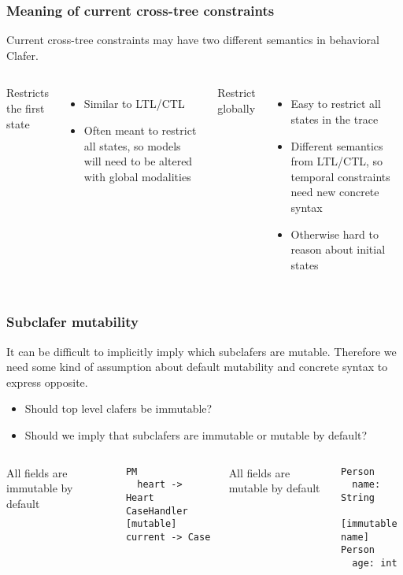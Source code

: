 \documentclass[xcolor=dvipsnames,12pt]{beamer}
\begin{document}
  \begin{frame}[fragile]
    \frametitle{Meaning of current cross-tree constraints}
    Current cross-tree constraints may have two different semantics in behavioral Clafer.

    \mbox{}

    \begin{columns}[t]
      \column{2in}
      Restricts the first state
      \begin{itemize}
        \item Similar to LTL/CTL
        \item Often meant to restrict all states, so models will need to be altered with global modalities
      \end{itemize}
    \column{2in}
    Restrict globally
    \begin{itemize}
      \item{Easy to restrict all states in the trace}
      \item{Different semantics from LTL/CTL, so temporal constraints need new concrete syntax}
      \item{Otherwise hard to reason about initial states}
      \end{itemize}
    \end{columns}    
\end{frame}

  \begin{frame}[fragile]
    \frametitle{Subclafer mutability}
    It can be difficult to implicitly imply which subclafers are mutable. Therefore we need some kind of assumption about default mutability and concrete syntax to express opposite.
    \begin{itemize}
      \item Should top level clafers be immutable? 
      \item Should we imply that subclafers are immutable or mutable by default?
    \end{itemize}
    \begin{columns}[t]
      \column{1.8in}
      All fields are immutable by default
\begin{verbatim}
PM
  heart -> Heart
CaseHandler
[mutable] current -> Case
\end{verbatim}
\column{1.8in}
All fields are mutable by default
\begin{verbatim}
Person
  name: String
  [immutable name]
Person
  age: int
\end{verbatim}
\end{columns}    
\end{frame}
\end{document}
